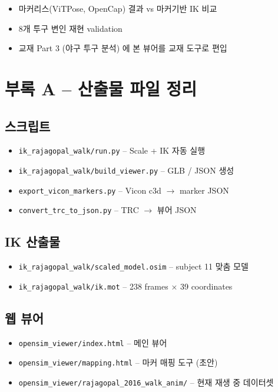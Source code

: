 \documentclass[11pt, a4paper]{report}
\begin{document}
\begin{tcolorbox}[colback=noteorange!5, colframe=noteorange!60, title=Long-term]
\begin{itemize}
  \item 마커리스(ViTPose, OpenCap) 결과 vs 마커기반 IK 비교
  \item 8개 투구 변인 재현 validation
  \item 교재 Part 3 (야구 투구 분석) 에 본 뷰어를 교재 도구로 편입
\end{itemize}
\end{tcolorbox}


\chapter*{부록 A -- 산출물 파일 정리}

\section*{스크립트}
\begin{itemize}
  \item \texttt{ik\_rajagopal\_walk/run.py} -- Scale + IK 자동 실행
  \item \texttt{ik\_rajagopal\_walk/build\_viewer.py} -- GLB / JSON 생성
  \item \texttt{export\_vicon\_markers.py} -- Vicon c3d $\to$ marker JSON
  \item \texttt{convert\_trc\_to\_json.py} -- TRC $\to$ 뷰어 JSON
\end{itemize}

\section*{IK 산출물}
\begin{itemize}
  \item \texttt{ik\_rajagopal\_walk/scaled\_model.osim} -- subject 11 맞춤 모델
  \item \texttt{ik\_rajagopal\_walk/ik.mot} -- 238 frames × 39 coordinates
\end{itemize}

\section*{웹 뷰어}
\begin{itemize}
  \item \texttt{opensim\_viewer/index.html} -- 메인 뷰어
  \item \texttt{opensim\_viewer/mapping.html} -- 마커 매핑 도구 (초안)
  \item \texttt{opensim\_viewer/rajagopal\_2016\_walk\_anim/} -- 현재 재생 중 데이터셋
\end{itemize}
\end{document}
